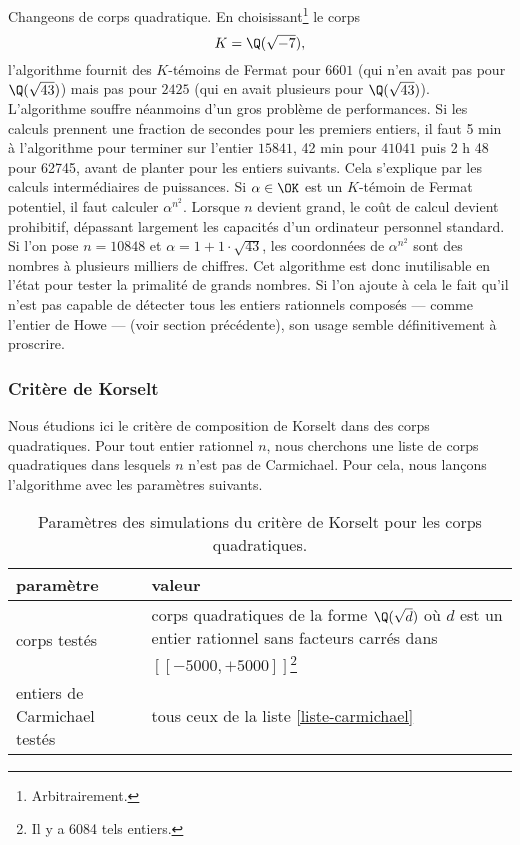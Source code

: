 Changeons de corps quadratique. En choisissant\footnote{Arbitrairement.} le corps \[K = \Q(\sqrt{-7}),\] l'algorithme fournit des $K$-témoins de Fermat pour $6601$ (qui n'en avait pas pour $\Q(\sqrt{43})$) mais pas pour $2425$ (qui en avait plusieurs pour $\Q(\sqrt{43})$). \\

L'algorithme souffre néanmoins d'un gros problème de performances. Si les calculs prennent une fraction de secondes pour les premiers entiers, il faut 5 min à l'algorithme pour terminer sur l'entier $15841$, 42 min pour $41041$ puis 2 h 48 pour 62745, avant de planter  pour les entiers suivants. Cela s'explique par les calculs intermédiaires de puissances. Si $\alpha\in \OK$ est un $K$-témoin de Fermat potentiel, il faut calculer $\alpha^{n^2}$. Lorsque $n$ devient grand, le coût de calcul devient prohibitif, dépassant largement les capacités d'un ordinateur personnel standard. Si l'on pose $n = 10848$ et $\alpha = 1 + 1\cdot \sqrt{43}$, les coordonnées de $\alpha^{n^2}$ sont des nombres à plusieurs milliers de chiffres. Cet algorithme est donc inutilisable en l'état pour tester la primalité de grands nombres. Si l'on ajoute à cela le fait qu'il n'est pas capable de détecter tous les entiers rationnels composés — comme l'entier de Howe — (voir section précédente), son usage semble définitivement à proscrire.
	

\subsubsection{Critère de Korselt}

Nous étudions ici le critère de composition de Korselt \label{test-primalite-korselt} dans des corps quadratiques. Pour tout entier rationnel $n$, nous cherchons une liste de corps quadratiques dans lesquels $n$ n'est pas de Carmichael. Pour cela, nous lançons l'algorithme avec les paramètres suivants.

\begin{table}[H]\label{param-korselt-quadra}
	\begin{center}
		\begin{tabularx}{\textwidth}{|Y|Y|}
			\hline
			paramètre & valeur \\
			\hline
			\hline
			corps testés & corps quadratiques de la forme $\Q(\sqrt{d})$ où $d$ est un entier rationnel sans facteurs carrés dans $[\![-5000, +5000]\!]$\footnote{Il y a 6084 tels entiers.} \\\hline
			entiers de Carmichael testés & tous ceux de la liste \ref{liste-carmichael}  \\\hline
		\end{tabularx}
		\caption{Paramètres des simulations du critère de Korselt pour les corps quadratiques.}
	\end{center}
\end{table}


